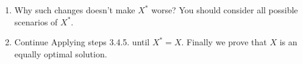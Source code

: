 \begin{parts}
\begin{enumerate}
\begin{solution}
        \vspace*{5cm}
    \end{solution}
    \item Why such changes doesn't make $X^*$ worse? You should consider all possible scenarios of $X^*$.
    \begin{solution}
    
        \vspace*{5cm}
    \end{solution}
    \item Continue Applying steps 3.4.5. until $X^*=X$. Finally we prove that $X$ is an equally optimal solution.
\end{enumerate}

\end{parts}
\newpage